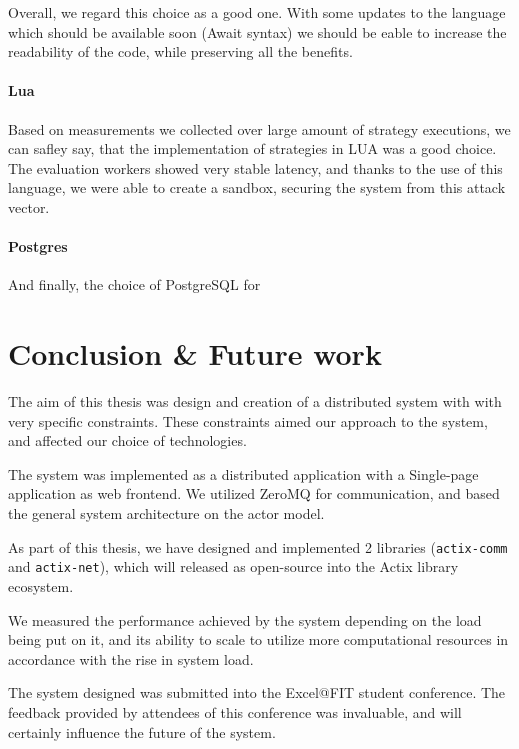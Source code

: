 Overall, we regard this choice as a good one. With some updates to the language which should be available soon (Await syntax)
we should be eable to increase the readability of the code, while preserving all the benefits.

\subsubsection{Lua}
Based on measurements we collected over large amount of strategy executions, we can safley say, that the implementation
of strategies  in LUA was a good choice. The evaluation workers showed very stable latency, and thanks to the use of this language,
we were able to create a sandbox, securing the system from this attack vector.

\subsubsection{Postgres}
And finally, the choice of PostgreSQL for

\chapter{Conclusion \& Future work}
The aim of this thesis was design and creation of a distributed system with with very specific constraints.
These constraints aimed our approach to the system, and affected our choice of technologies.

The system was implemented as a distributed application with a Single-page application as web frontend. We utilized
ZeroMQ for communication, and based the general system architecture on the actor model.

As part of this thesis, we have designed and implemented 2 libraries (\verb|actix-comm| and \verb|actix-net|), which
will released as open-source into the Actix library ecosystem.

We measured the performance achieved by the system depending on the load being put on it, and its ability to scale to
utilize more computational resources in accordance with the rise in system load.

The system designed was submitted into the Excel@FIT student conference. The feedback provided by attendees of this
conference was invaluable, and will certainly influence the future of the system.

